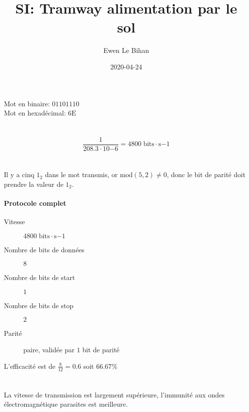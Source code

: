 \documentclass{article}
\title{SI: Tramway alimentation par le sol}
\author{Ewen Le Bihan}
\date{2020-04-24}
\begin{document}
\maketitle

\section{}

Mot en binaire: $01101110$\\
Mot en hexadécimal: $6\text{E}$

\section{}

$$\frac{1}{208.3\cdot10{-6}} = 4800 \;\text{bits}\cdot\text{s}{-1}$$

\section{}

Il y a cinq $1_2$ dans le mot transmis, or $\text{mod}(5, 2) \not= 0$, donc le bit de parité doit prendre la valeur de $1_2$.

\paragraph{Protocole complet}
\begin{description}
    \item[Vitesse] $4800 \;\text{bits}\cdot\text{s}{-1}$
    \item[Nombre de bits de données] $8$
    \item[Nombre de bits de start]  $1$
    \item[Nombre de bits de stop]  $2$
    \item[Parité] paire, validée par $1$ bit de parité
\end{description}

L'efficacité est de $\frac{8}{12} = 0.6$ soit $66.67\%$

\section{}

La vitesse de transmission est largement supérieure, l'immunité aux ondes électromagnétique parasites est meilleure.
\end{document}
